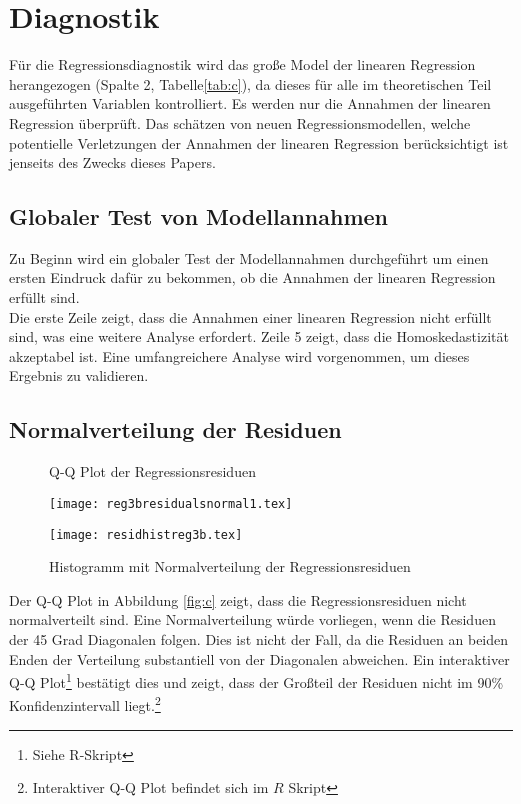 \documentclass[11pt,a4paper]{article}
\begin{document}
\section{Diagnostik}
Für die Regressionsdiagnostik wird das große Model der linearen Regression herangezogen (Spalte 2, Tabelle\ref{tab:c}), da dieses für alle im theoretischen Teil ausgeführten Variablen kontrolliert. Es werden nur die Annahmen der linearen Regression überprüft. Das schätzen von neuen Regressionsmodellen, welche potentielle Verletzungen der Annahmen der linearen Regression berücksichtigt ist jenseits des Zwecks dieses Papers. 
 
\subsection{Globaler Test von Modellannahmen}

Zu Beginn wird ein globaler Test der Modellannahmen durchgeführt um einen ersten Eindruck dafür zu bekommen, ob die Annahmen der linearen Regression erfüllt sind.\\ 

Die erste Zeile zeigt, dass die Annahmen einer linearen Regression nicht erfüllt sind, was eine weitere Analyse erfordert. 
Zeile 5 zeigt, dass die Ho­mo­s­ke­das­ti­zi­tät akzeptabel ist. Eine umfangreichere Analyse wird vorgenommen, um dieses Ergebnis zu validieren. 

\subsection{Normalverteilung der Residuen}

\begin{figure}
    \centering
    \begin{minipage}{0.45\textwidth}
\caption{Q-Q Plot der Regressionsresiduen}\label{fig:c}
        \texttt{[image: reg3bresidualsnormal1.tex]} %
        
    \end{minipage}\hfill
    \begin{minipage}{0.45\textwidth}
\caption{Histogramm mit Normalverteilung der Regressionsresiduen}\label{fig:d}
        \texttt{[image: residhistreg3b.tex]} %
        
    \end{minipage}
\end{figure}

Der Q-Q Plot in Abbildung \ref{fig:c} zeigt, dass die Regressionsresiduen nicht normalverteilt sind. Eine Normalverteilung würde vorliegen, wenn die Residuen der 45 Grad Diagonalen folgen. Dies ist nicht der Fall, da die Residuen an beiden Enden der Verteilung substantiell von der Diagonalen abweichen. Ein interaktiver Q-Q Plot\footnote{Siehe R-Skript} bestätigt dies und zeigt, dass der Großteil der Residuen nicht im 90\% Konfidenzintervall liegt.\footnote{Interaktiver Q-Q Plot befindet sich im $R$ Skript}\\
\end{document}
